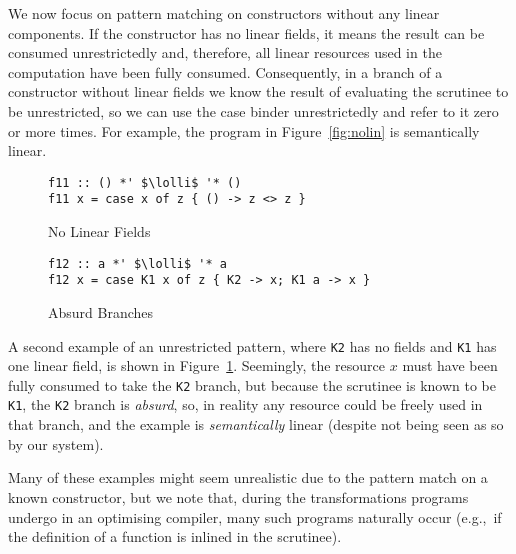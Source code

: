 \documentclass[acmsmall,review,anonymous]{acmart}
\newcommand{\incode}[1]{\lstinline{#1}}
\newcommand{\lolli}{\multimap}
\begin{document}
We now focus on pattern matching on constructors without
any linear components. If the constructor has no linear fields, it means the
result can be consumed unrestrictedly and, therefore, all linear resources used
in the computation have been fully consumed.
%
Consequently, in a branch of a constructor without linear fields we know the
result of evaluating the scrutinee to be unrestricted, so we can use the case
binder unrestrictedly and refer to it zero or more times. For example,
the program in Figure~\ref{fig:nolin} is semantically linear.
%
\begin{figure}[t]
 \begin{minipage}{0.5\textwidth}
\begin{notyet}
\begin{lstlisting}
f11 :: () *' $\lolli$ '* ()
f11 x = case x of z { () -> z <> z }
\end{lstlisting}
\end{notyet}
\vspace{-0.5cm}
\caption{No Linear Fields\label{fig:nolin}}
\end{minipage}%
\begin{minipage}{0.5\textwidth}
\begin{limitation}
\begin{lstlisting}
f12 :: a *' $\lolli$ '* a
f12 x = case K1 x of z { K2 -> x; K1 a -> x }
\end{lstlisting}
\end{limitation}
\vspace{-0.5cm}
\caption{Absurd Branches\label{fig:absurd}}
\end{minipage}
\end{figure}
%
A second example of an unrestricted pattern, where \incode{K2} has no fields and \incode{K1}
has one linear field, is shown in Figure~\ref{fig:absurd}. Seemingly, the resource
$x$ must have been fully consumed to take the \incode{K2} branch, but because the
scrutinee is known to be \incode{K1}, the \incode{K2} branch is \emph{absurd}, so, in reality
any resource could be freely used in that branch, and the example is
\emph{semantically} linear (despite not being seen as so by our system).

Many of these examples might seem unrealistic due to the pattern
match on a known constructor, but we note that, during the
transformations programs undergo in an optimising compiler, many
such programs naturally occur (e.g.,~if the definition of a
function is inlined in the scrutinee).
%
\end{document}
